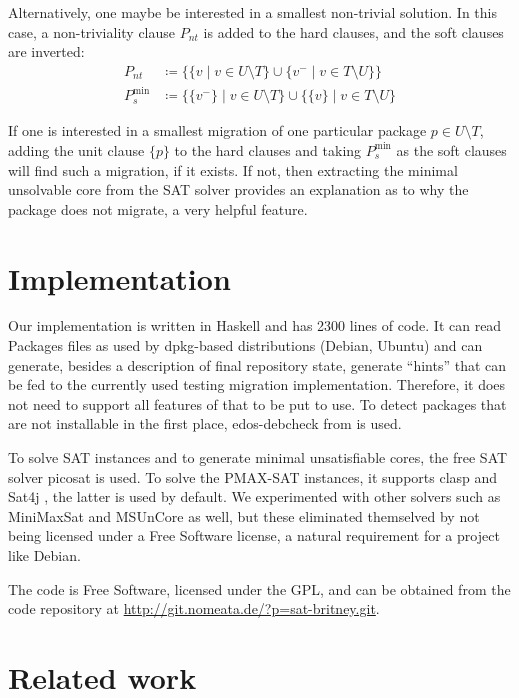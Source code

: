 \documentclass[halfparskip,11pt]{scrartcl}
\begin{document}
Alternatively, one maybe be interested in a smallest non-trivial solution. In this case, a non-triviality clause $P_{nt}$ is added to the hard clauses, and the soft clauses are inverted:
\begin{align*}
P_{nt} &\coloneqq \{ \{ v \mid v \in U\setminus T\} \cup \{v^- \mid v \in T\setminus U\} \} \\
P_s^{\text{min}} &\coloneqq \{ \{v^-\} \mid v \in U\setminus T\} \cup \{ \{v\} \mid v \in T\setminus U\}
\end{align*}

If one is interested in a smallest migration of one particular package $p\in U\setminus T$, adding the unit clause $\{p\}$ to the hard clauses and taking $P_s^{\text{min}}$ as the soft clauses will find such a migration, if it exists. If not, then extracting the minimal unsolvable core from the SAT solver provides an explanation as to why the package does not migrate, a very helpful feature.

\section{Implementation}

Our implementation is written in Haskell and has 2300 lines of code. It can read Packages files as used by dpkg-based distributions (Debian, Ubuntu) and can generate, besides a description of final repository state, generate “hints” that can be fed to the currently used testing migration implementation. Therefore, it does not need to support all features of that to be put to use. To detect packages that are not installable in the first place, edos-debcheck from \cite{edos} is used.

To solve SAT instances and to generate minimal unsatisfiable cores, the free SAT solver picosat \cite{picosat} is used. To solve the PMAX-SAT instances, it supports clasp \cite{clasp} and Sat4j \cite{sat4j}, the latter is used by default. We experimented with other solvers such as MiniMaxSat and MSUnCore as well, but these eliminated themselved by not being licensed under a Free Software license, a natural requirement for a project like Debian.


The code is Free Software, licensed under the GPL, and can be obtained from  the code repository at \url{http://git.nomeata.de/?p=sat-britney.git}.

\section{Related work}
\end{document}
